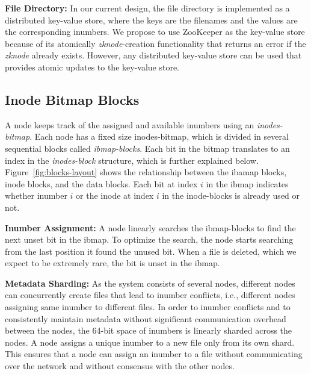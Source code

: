 \documentclass[]{article}
\newcommand{\subtopic}[1]{\vspace{1.5pt} \noindent \textbf{#1}}
\begin{document}
\subtopic{File Directory:}
In our current design, the file directory is implemented as a distributed
key-value store, where the keys are the filenames and the values are the corresponding
inumbers. We propose to use ZooKeeper as the key-value store because of its
atomically \textit{zknode}-creation functionality that returns an error if
the \textit{zknode} already exists. However, any distributed key-value store can be used 
that provides atomic updates to the key-value store.


\subsection{Inode Bitmap Blocks}
A node keeps track of the assigned and available inumbers using an \textit{inodes-bitmap}.
Each node has a fixed size inodes-bitmap, which is divided in several sequential blocks
called \textit{ibmap-blocks}. Each bit in the bitmap translates to an index in the
\textit{inodes-block} structure, which is further explained below.
Figure~\ref{fig:blocks-layout} shows the relationship between the ibamap blocks, 
inode blocks, and the data blocks. Each bit at index $i$ in the
ibmap indicates whether inumber $i$ or the inode at index $i$ in the inode-blocks
is already used or not.

\subtopic{Inumber Assignment:}
A node linearly searches the ibmap-blocks to find the next unset bit in the ibmap.
To optimize the search, the node starts searching from the last position it
found the unused bit. When a file is deleted, which we expect to be extremely
rare, the bit is unset in the ibmap.



\subtopic{Metadata Sharding:} As the system consists of several nodes,
different nodes can concurrently create files that lead to inumber conflicts,
i.e., different nodes assigning same inumber to different files.  In order to
inumber conflicts and to  consistently maintain metadata without significant
communication overhead between the nodes, the 64-bit space of inumbers is
linearly sharded across the nodes. A node assigns a unique inumber to a new
file only from its own shard. This ensures that a node can assign an inumber
to a file without communicating over the network and without consensus
with the other nodes.
\end{document}
